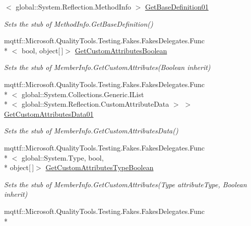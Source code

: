 \begin{DoxyCompactItemize}
$<$ global\-::\-System.\-Reflection.\-Method\-Info $>$ \hyperlink{class_system_1_1_reflection_1_1_fakes_1_1_stub_method_info_a0a66f396d812debf2a9185ebcc05e29d}{Get\-Base\-Definition01}
\begin{DoxyCompactList}\small\item\em Sets the stub of Method\-Info.\-Get\-Base\-Definition()\end{DoxyCompactList}\item 
mqttf\-::\-Microsoft.\-Quality\-Tools.\-Testing.\-Fakes.\-Fakes\-Delegates.\-Func\\*
$<$ bool, object\mbox{[}$\,$\mbox{]}$>$ \hyperlink{class_system_1_1_reflection_1_1_fakes_1_1_stub_method_info_abf1faafa9b81bfef7dea1fb0443fde5a}{Get\-Custom\-Attributes\-Boolean}
\begin{DoxyCompactList}\small\item\em Sets the stub of Member\-Info.\-Get\-Custom\-Attributes(\-Boolean inherit)\end{DoxyCompactList}\item 
mqttf\-::\-Microsoft.\-Quality\-Tools.\-Testing.\-Fakes.\-Fakes\-Delegates.\-Func\\*
$<$ global\-::\-System.\-Collections.\-Generic.\-I\-List\\*
$<$ global\-::\-System.\-Reflection.\-Custom\-Attribute\-Data $>$ $>$ \hyperlink{class_system_1_1_reflection_1_1_fakes_1_1_stub_method_info_a505288d8d68f6ce94e6eaca62b97f98f}{Get\-Custom\-Attributes\-Data01}
\begin{DoxyCompactList}\small\item\em Sets the stub of Member\-Info.\-Get\-Custom\-Attributes\-Data()\end{DoxyCompactList}\item 
mqttf\-::\-Microsoft.\-Quality\-Tools.\-Testing.\-Fakes.\-Fakes\-Delegates.\-Func\\*
$<$ global\-::\-System.\-Type, bool, \\*
object\mbox{[}$\,$\mbox{]}$>$ \hyperlink{class_system_1_1_reflection_1_1_fakes_1_1_stub_method_info_a8a6b02076fdb7fec2f443f501afbc722}{Get\-Custom\-Attributes\-Type\-Boolean}
\begin{DoxyCompactList}\small\item\em Sets the stub of Member\-Info.\-Get\-Custom\-Attributes(\-Type attribute\-Type, Boolean inherit)\end{DoxyCompactList}\item 
mqttf\-::\-Microsoft.\-Quality\-Tools.\-Testing.\-Fakes.\-Fakes\-Delegates.\-Func\\*

\end{DoxyCompactItemize}
